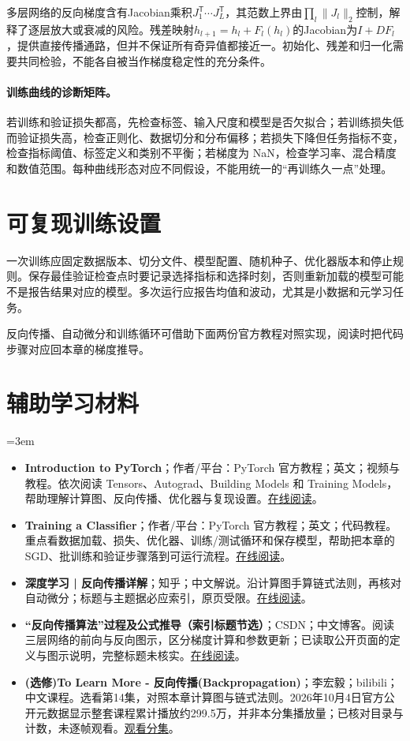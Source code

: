 多层网络的反向梯度含有Jacobian乘积$J_1^{\mathsf T}\cdots J_L^{\mathsf T}$，其范数上界由$\prod_l\|J_l\|_2$控制，解释了逐层放大或衰减的风险。残差映射$h_{l+1}=h_l+F_l(h_l)$的Jacobian为$I+DF_l$，提供直接传播通路，但并不保证所有奇异值都接近一。初始化、残差和归一化需要共同检验，不能各自被当作梯度稳定性的充分条件。

\paragraph{训练曲线的诊断矩阵。}
若训练和验证损失都高，先检查标签、输入尺度和模型是否欠拟合；若训练损失低而验证损失高，检查正则化、数据切分和分布偏移；若损失下降但任务指标不变，检查指标阈值、标签定义和类别不平衡；若梯度为 NaN，检查学习率、混合精度和数值范围。每种曲线形态对应不同假设，不能用统一的“再训练久一点”处理。

\section{可复现训练设置}
一次训练应固定数据版本、切分文件、模型配置、随机种子、优化器版本和停止规则。保存最佳验证检查点时要记录选择指标和选择时刻，否则重新加载的模型可能不是报告结果对应的模型。多次运行应报告均值和波动，尤其是小数据和元学习任务。

反向传播、自动微分和训练循环可借助下面两份官方教程对照实现，阅读时把代码步骤对应回本章的梯度推导。
\section*{辅助学习材料}
\begingroup
\emergencystretch=3em
\begin{itemize}
\item \textbf{Introduction to PyTorch}；作者/平台：PyTorch 官方教程；英文；视频与教程。依次阅读 Tensors、Autograd、Building Models 和 Training Models，帮助理解计算图、反向传播、优化器与复现设置。\href{https://docs.pytorch.org/tutorials/beginner/introyt/introyt1\_tutorial.html}{在线阅读}。
\item \textbf{Training a Classifier}；作者/平台：PyTorch 官方教程；英文；代码教程。重点看数据加载、损失、优化器、训练/测试循环和保存模型，帮助把本章的 SGD、批训练和验证步骤落到可运行流程。\href{https://docs.pytorch.org/tutorials/beginner/blitz/cifar10\_tutorial.html}{在线阅读}。
\item \textbf{深度学习 | 反向传播详解}；知乎；中文解说。沿计算图手算链式法则，再核对自动微分；标题与主题据必应索引，原页受限。\href{https://zhuanlan.zhihu.com/p/115571464}{在线阅读}。
\item \textbf{“反向传播算法”过程及公式推导（索引标题节选）}；CSDN；中文博客。阅读三层网络的前向与反向图示，区分梯度计算和参数更新；已读取公开页面的定义与图示说明，完整标题未核实。\href{https://blog.csdn.net/ft\_sunshine/article/details/90221691}{在线阅读}。
\item \textbf{(选修)To Learn More - 反向传播(Backpropagation)}；李宏毅；bilibili；中文课程。选看第14集，对照本章计算图与链式法则。2026年10月4日官方公开元数据显示整套课程累计播放约299.5万，并非本分集播放量；已核对目录与计数，未逐帧观看。\href{https://www.bilibili.com/video/BV1Wv411h7kN/?p=14}{观看分集}。
\end{itemize}
\endgroup

